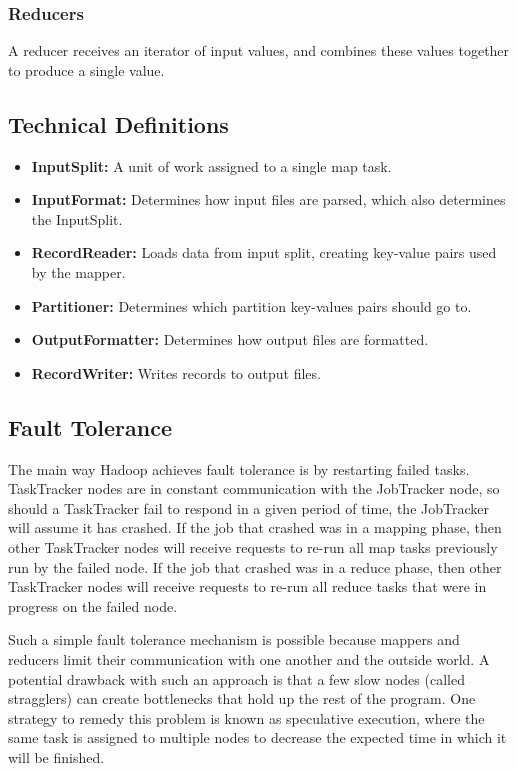 \documentclass[12pt,titlepage]{article}
\begin{document}
      \subsubsection{Reducers}
        A reducer receives an iterator of input values, and combines these values together to produce a single value.

    \subsection{Technical Definitions}
      \begin{itemize}
        \item \textbf{InputSplit:} A unit of work assigned to a single map task.
        \item \textbf{InputFormat:} Determines how input files are parsed, which also determines the InputSplit.
        \item \textbf{RecordReader:} Loads data from input split, creating key-value pairs used by the mapper.
        \item \textbf{Partitioner:} Determines which partition key-values pairs should go to.
        \item \textbf{OutputFormatter:} Determines how output files are formatted.
        \item \textbf{RecordWriter:} Writes records to output files.
      \end{itemize}

    \subsection{Fault Tolerance}
      The main way Hadoop achieves fault tolerance is by restarting failed tasks. TaskTracker nodes are in constant communication with the JobTracker node, so should
      a TaskTracker fail to respond in a given period of time, the JobTracker will assume it has crashed. If the job that crashed was in a mapping phase, then other
      TaskTracker nodes will receive requests to re-run all map tasks previously run by the failed node. If the job that crashed was in a reduce phase, then other
      TaskTracker nodes will receive requests to re-run all reduce tasks that were in progress on the failed node.

      Such a simple fault tolerance mechanism is possible because mappers and reducers limit their communication with one another and the outside world. A potential
      drawback with such an approach is that a few slow nodes (called stragglers) can create bottlenecks that hold up the rest of the program. One strategy to remedy
      this problem is known as speculative execution, where the same task is assigned to multiple nodes to decrease the expected time in which it will be finished.
\end{document}

